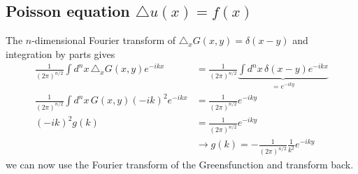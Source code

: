 \documentclass[10pt,a4paper]{book}
\theoremstyle{definition}
\begin{document}
\newpage
\subsection{Poisson equation \texorpdfstring{$\triangle u(x) = f(x)$}{TEXT}}
        
The $n$-dimensional Fourier transform of $\triangle_x G(x,y) = \delta(x-y)$ and integration by parts gives
    \begin{align}
        \frac{1}{(2\pi)^{n/2}}\int d^nx\,\triangle_x G(x,y) e^{-ikx}&=\frac{1}{(2\pi)^{n/2}}\underbrace{\int d^nx\,\delta(x-y) e^{-ikx}}_{=e^{-iky}}\\
        \frac{1}{(2\pi)^{n/2}}\int d^nx\, G(x,y) (-ik)^2 e^{-ikx}&=\frac{1}{(2\pi)^{n/2}}e^{-iky}\\
        (-ik)^2g(k)&=\frac{1}{(2\pi)^{n/2}}e^{-iky}\\
        &\rightarrow g(k)=-\frac{1}{(2\pi)^{n/2}}\frac{1}{k^2}e^{-iky}
    \end{align}
    we can now use the Fourier transform of the Greensfunction and transform back.
\end{document}
